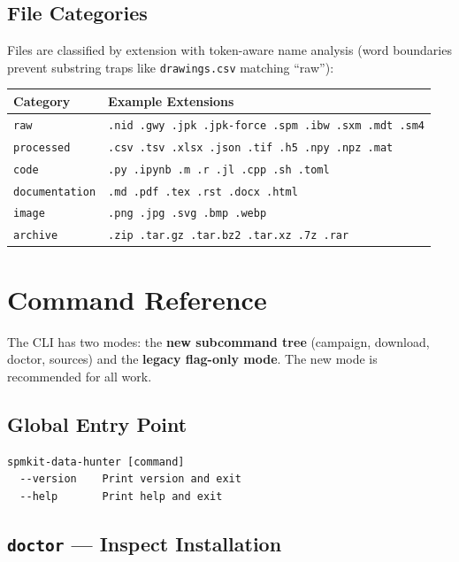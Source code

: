 \documentclass[11pt,a4paper]{article}
\begin{document}
\subsection{File Categories}

Files are classified by extension with token-aware name analysis (word boundaries prevent substring traps like \texttt{drawings.csv} matching ``raw''):

\begin{center}
\begin{tabular}{ll}
\toprule
\textbf{Category} & \textbf{Example Extensions} \\
\midrule
\texttt{raw} & \texttt{.nid .gwy .jpk .jpk-force .spm .ibw .sxm .mdt .sm4} \\
\texttt{processed} & \texttt{.csv .tsv .xlsx .json .tif .h5 .npy .npz .mat} \\
\texttt{code} & \texttt{.py .ipynb .m .r .jl .cpp .sh .toml} \\
\texttt{documentation} & \texttt{.md .pdf .tex .rst .docx .html} \\
\texttt{image} & \texttt{.png .jpg .svg .bmp .webp} \\
\texttt{archive} & \texttt{.zip .tar.gz .tar.bz2 .tar.xz .7z .rar} \\
\bottomrule
\end{tabular}
\end{center}

\section{Command Reference}

The CLI has two modes: the \textbf{new subcommand tree} (campaign, download, doctor, sources) and the \textbf{legacy flag-only mode}. The new mode is recommended for all work.

\subsection{Global Entry Point}

\begin{lstlisting}
spmkit-data-hunter [command]
  --version    Print version and exit
  --help       Print help and exit
\end{lstlisting}

\subsection{\texttt{doctor} --- Inspect Installation}
\end{document}
